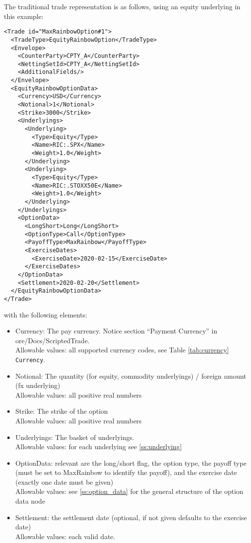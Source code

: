The traditional trade representation is as follows, using an equity underlying in this example:

\begin{verbatim}
<Trade id="MaxRainbowOption#1">
  <TradeType>EquityRainbowOption</TradeType>
  <Envelope>
    <CounterParty>CPTY_A</CounterParty>
    <NettingSetId>CPTY_A</NettingSetId>
    <AdditionalFields/>
  </Envelope>
  <EquityRainbowOptionData>
    <Currency>USD</Currency>
    <Notional>1</Notional>
    <Strike>3000</Strike>
    <Underlyings>
      <Underlying>
        <Type>Equity</Type>
        <Name>RIC:.SPX</Name>
        <Weight>1.0</Weight>
      </Underlying>
      <Underlying>
        <Type>Equity</Type>
        <Name>RIC:.STOXX50E</Name>
        <Weight>1.0</Weight>
      </Underlying>
    </Underlyings>
    <OptionData>
      <LongShort>Long</LongShort>
      <OptionType>Call</OptionType>
      <PayoffType>MaxRainbow</PayoffType>
      <ExerciseDates>
        <ExerciseDate>2020-02-15</ExerciseDate>
      </ExerciseDates>
    </OptionData>
    <Settlement>2020-02-20</Settlement>
  </EquityRainbowOptionData>
</Trade>
\end{verbatim}

with the following elements:

\begin{itemize}
\item Currency: The pay currency. Notice section ``Payment Currency'' in ore/Docs/ScriptedTrade. \\
  Allowable values: all supported currency codes, see Table \ref{tab:currency} \lstinline!Currency!.
\item Notional: The quantity (for equity, commodity underlyings) / foreign amount (fx underlying) \\
  Allowable values: all positive real numbers
\item Strike: The strike of the option \\
  Allowable values: all positive real numbers
\item Underlyings: The basket of underlyings. \\
  Allowable values: for each underlying see \ref{ss:underlying}
\item OptionData: relevant are the long/short flag, the option type, the payoff type (must be set to MaxRainbow to
  identify the payoff), and the exercise date (exactly one date must be given) \\
  Allowable values: see \ref{ss:option_data} for the general structure of the option data node
\item Settlement: the settlement date (optional, if not given defaults to the exercise date) \\
  Allowable values: each valid date.
\end{itemize}

